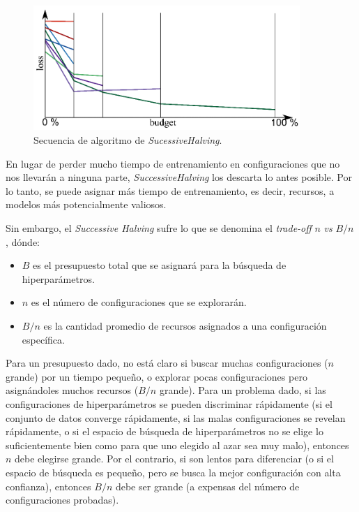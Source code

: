 \documentclass[a4paper,12pt]{article}
\begin{document}
\begin{figure}[H]
	\begin{center}
	\includegraphics[width=0.9\textwidth]{sucessive_halving.png}
  	\caption{Secuencia de algoritmo de \textit{SucessiveHalving}.}
  	\label{fig:sh}
  	\end{center}
\end{figure}

En lugar de perder mucho tiempo de entrenamiento en configuraciones que no nos llevarán a ninguna parte, \textit{SuccessiveHalving} los descarta lo antes posible. Por lo tanto, se puede asignar más tiempo de entrenamiento, es decir, recursos, a modelos más potencialmente valiosos.

Sin embargo, el \textit{Successive Halving} sufre lo que se denomina el \textit{trade-off} $n$ \textit{vs} $B/n$ \citep{Bissuel2019Apr}, dónde:
\begin{itemize}
	\item $B$ es el presupuesto total que se asignará para la búsqueda de hiperparámetros.
	\item $n$ es el número de configuraciones que se explorarán.
	\item $B/n$ es la cantidad promedio de recursos asignados a una configuración específica.
\end{itemize}

Para un presupuesto dado, no está claro si buscar muchas configuraciones ($n$ grande) por un tiempo pequeño, o explorar pocas configuraciones pero asignándoles muchos recursos ($B/n$ grande). Para un problema dado, si las configuraciones de hiperparámetros se pueden discriminar rápidamente (si el conjunto de datos converge rápidamente, si las malas configuraciones se revelan rápidamente, o si el espacio de búsqueda de hiperparámetros no se elige lo suficientemente bien como para que uno elegido al azar sea muy malo), entonces $n$ debe elegirse grande. Por el contrario, si son lentos para diferenciar (o si el espacio de búsqueda es pequeño, pero se busca la mejor configuración con alta confianza), entonces $B/n$ debe ser grande (a expensas del número de configuraciones probadas).
\end{document}
